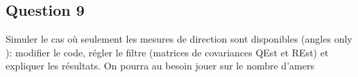 \documentclass[../CSC_5RO12_TA_TP2.tex]{subfiles}
\begin{document}
\subsection{Question 9}

Simuler le cas où seulement les mesures de direction sont disponibles (angles only ): modifier le code, régler le filtre (matrices de covariances QEst et REst) et expliquer les résultats. On pourra au besoin jouer sur le nombre d'amers
\end{document}
